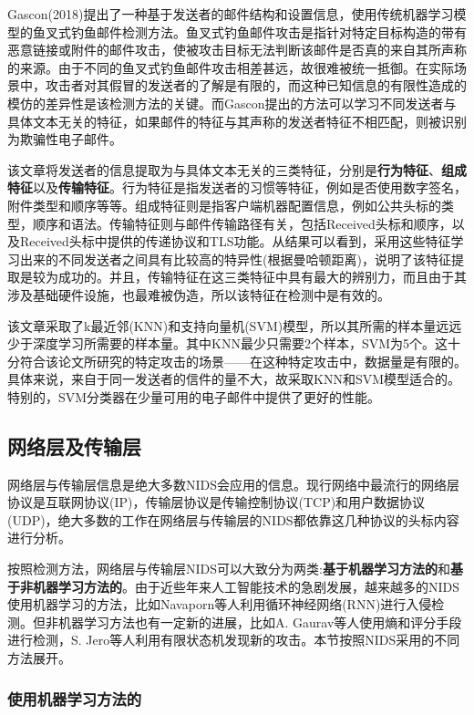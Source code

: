 \documentclass[12pt]{article} %
\begin{document}
Gascon(2018)\cite{Gascon}提出了一种基于发送者的邮件结构和设置信息，使用传统机器学习模型的鱼叉式钓鱼邮件检测方法。鱼叉式钓鱼邮件攻击是指针对特定目标构造的带有恶意链接或附件的邮件攻击，使被攻击目标无法判断该邮件是否真的来自其所声称的来源。由于不同的鱼叉式钓鱼邮件攻击相差甚远，故很难被统一抵御。在实际场景中，攻击者对其假冒的发送者的了解是有限的，而这种已知信息的有限性造成的模仿的差异性是该检测方法的关键。而Gascon提出的方法可以学习不同发送者与具体文本无关的特征，如果邮件的特征与其声称的发送者特征不相匹配，则被识别为欺骗性电子邮件。

该文章将发送者的信息提取为与具体文本无关的三类特征，分别是\textbf{行为特征}、\textbf{组成特征}以及\textbf{传输特征}。行为特征是指发送者的习惯等特征，例如是否使用数字签名，附件类型和顺序等等。组成特征则是指客户端机器配置信息，例如公共头标的类型，顺序和语法。传输特征则与邮件传输路径有关，包括Received头标和顺序，以及Received头标中提供的传递协议和TLS功能。从结果可以看到，采用这些特征学习出来的不同发送者之间具有比较高的特异性(根据曼哈顿距离)，说明了该特征提取是较为成功的。并且，传输特征在这三类特征中具有最大的辨别力，而且由于其涉及基础硬件设施，也最难被伪造，所以该特征在检测中是有效的。

该文章采取了k最近邻(KNN)和支持向量机(SVM)模型，所以其所需的样本量远远少于深度学习所需要的样本量。其中KNN最少只需要2个样本，SVM为5个。这十分符合该论文所研究的特定攻击的场景——在这种特定攻击中，数据量是有限的。具体来说，来自于同一发送者的信件的量不大，故采取KNN和SVM模型适合的。特别的，SVM分类器在少量可用的电子邮件中提供了更好的性能。

\subsection{网络层及传输层}
\label{ip}

网络层与传输层信息是绝大多数NIDS会应用的信息。现行网络中最流行的网络层协议是互联网协议(IP)，传输层协议是传输控制协议(TCP)和用户数据协议(UDP)，绝大多数的工作在网络层与传输层的NIDS都依靠这几种协议的头标内容进行分析。

按照检测方法，网络层与传输层NIDS可以大致分为两类:\textbf{基于机器学习方法的}和\textbf{基于非机器学习方法的}。由于近些年来人工智能技术的急剧发展，越来越多的NIDS使用机器学习的方法，比如Navaporn等人利用循环神经网络(RNN)进行入侵检测。但非机器学习方法也有一定新的进展，比如A. Gaurav等人使用熵和评分手段进行检测，S. Jero等人利用有限状态机发现新的攻击。本节按照NIDS采用的不同方法展开。

\subsubsection{使用机器学习方法的}
\label{ml}
\end{document}
